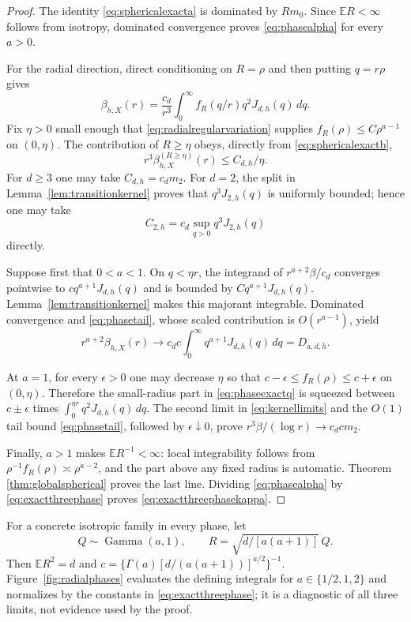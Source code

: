 \documentclass[11pt]{article}
\newcommand{\E}{\mathbb E}
\begin{document}
\begin{proof}
The identity \eqref{eq:sphericalexacta} is dominated by $Rm_0$.  Since $\E R<\infty$ follows from isotropy,
dominated convergence proves \eqref{eq:phasealpha} for every $a>0$.

For the radial direction, direct conditioning on $R=\rho$ and then putting $q=r\rho$ gives
\begin{equation}
 \beta_{h,X}(r)=\frac{c_d}{r^3}\int_0^\infty f_R(q/r)q^2J_{d,h}(q)\,dq.
 \label{eq:phaseexactq}
\end{equation}
Fix $\eta>0$ small enough that \eqref{eq:radialregularvariation} supplies
$f_R(\rho)\le C\rho^{a-1}$ on $(0,\eta)$.  The contribution of $R\ge\eta$ obeys, directly from
\eqref{eq:sphericalexactb},
\begin{equation}
 r^3\beta_{h,X}^{(R\ge\eta)}(r)\le C_{d,h}/\eta.
 \label{eq:phasetail}
\end{equation}
For $d\ge3$ one may take $C_{d,h}=c_dm_2$.  For $d=2$, the split in
Lemma~\ref{lem:transitionkernel} proves that $q^3J_{2,h}(q)$ is uniformly bounded; hence one may take
\[
 C_{2,h}=c_d\sup_{q>0}q^3J_{2,h}(q)
\]
directly.

Suppose first that $0<a<1$.  On $q<\eta r$, the integrand of $r^{a+2}\beta/c_d$ converges pointwise to
$cq^{a+1}J_{d,h}(q)$ and is bounded by $Cq^{a+1}J_{d,h}(q)$.  Lemma~\ref{lem:transitionkernel} makes this
majorant integrable.  Dominated convergence and \eqref{eq:phasetail}, whose scaled contribution is
$O(r^{a-1})$, yield
\[
 r^{a+2}\beta_{h,X}(r)\longrightarrow
 c_dc\int_0^\infty q^{a+1}J_{d,h}(q)\,dq=D_{a,d,h}.
\]

At $a=1$, for every $\epsilon>0$ one may decrease $\eta$ so that
$c-\epsilon\le f_R(\rho)\le c+\epsilon$ on $(0,\eta)$.  Therefore the small-radius part in
\eqref{eq:phaseexactq} is squeezed between $c\pm\epsilon$ times
$\int_0^{\eta r}q^2J_{d,h}(q)\,dq$.  The second limit in \eqref{eq:kernellimits} and the $O(1)$ tail
bound \eqref{eq:phasetail}, followed by $\epsilon\downarrow0$, prove
$r^3\beta/(\log r)\to c_dcm_2$.

Finally, $a>1$ makes $\E R^{-1}<\infty$: local integrability follows from
$\rho^{-1}f_R(\rho)\asymp\rho^{a-2}$, and the part above any fixed radius is automatic.  Theorem
\ref{thm:globalspherical} proves the last line.  Dividing \eqref{eq:phasealpha} by
\eqref{eq:exactthreephase} proves \eqref{eq:exactthreephasekappa}.
\end{proof}

For a concrete isotropic family in every phase, let
\[
 Q\sim\operatorname{Gamma}(a,1),\qquad R=\sqrt{d/[a(a+1)]}\,Q.
\]
Then $\E R^2=d$ and
$c=\{\Gamma(a)[d/(a(a+1))]^{a/2}\}^{-1}$.  Figure~\ref{fig:radialphases} evaluates the defining integrals
for $a\in\{1/2,1,2\}$ and normalizes by the constants in \eqref{eq:exactthreephase}; it is a diagnostic of all
three limits, not evidence used by the proof.
\end{document}
